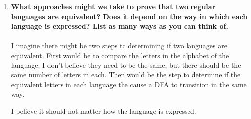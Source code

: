 \begin{enumerate}
\newpage
\item \textbf{What approaches might we take to prove that two regular languages are equivalent? Does it depend on the way in which each language is expressed? List as many ways as you can think of.}
%
% 
\\\\
I imagine there might be two steps to determining  if two languages are equivalent.  First would be to compare the letters in the alphabet of the language.  I don't believe they need to be the same, but there should be the same number of letters in each.  Then would be the step to determine if the equivalent letters in each language the cause a DFA to transition in the same way.

I believe it should not matter how the language is expressed.  
		
		
\end{enumerate}


